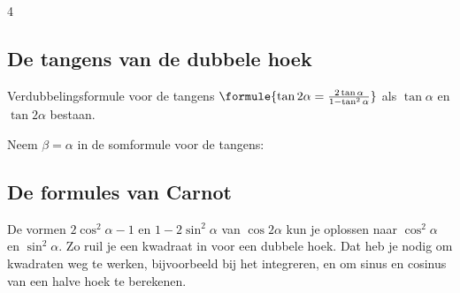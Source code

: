 \begin{alleenvoor}{4}
\subsection{De tangens van de dubbele hoek}

\begin{theorie}
\begin{stelling}{Verdubbelingsformule voor de tangens}
\qquad $\formule{\tan 2\alpha = \frac{2\tan\alpha}{1 - \tan^2\alpha}}$ \quad als $\tan\alpha$ en $\tan 2\alpha$ bestaan.
\end{stelling}
\begin{bewijs}
Neem $\beta = \alpha$ in de somformule voor de tangens:
\end{bewijs}
\end{theorie}


\begin{oefeningen}
\end{oefeningen}

\subsection{De formules van Carnot}

De vormen $2\cos^2\alpha - 1$ en $1 - 2\sin^2\alpha$ van $\cos 2\alpha$ kun je oplossen naar $\cos^2\alpha$ en $\sin^2\alpha$. Zo ruil je een kwadraat in voor een dubbele hoek. Dat heb je nodig om kwadraten weg te werken, bijvoorbeeld bij het integreren, en om sinus en cosinus van een halve hoek te berekenen.


\end{alleenvoor}

